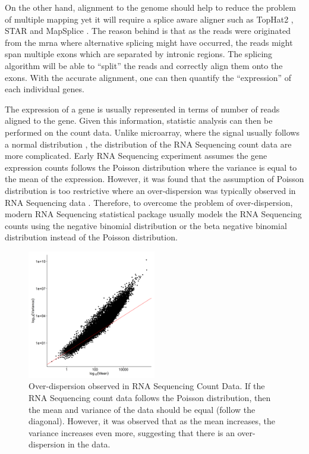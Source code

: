 \documentclass[12pt]{scrbook}
\begin{document}
	On the other hand, alignment to the genome should help to reduce the problem of multiple mapping yet it will require a splice aware aligner such as TopHat2 \citep{Kim2013}, STAR \citep{Dobin2013} and MapSplice \citep{Wang2010}.
	The reason behind is that as the reads were originated from the \gls{mrna} where alternative splicing might have occurred, the reads might span multiple exons which are separated by intronic regions. 
	The splicing algorithm will be able to ``split'' the reads and correctly align them onto the exons. 
	With the accurate alignment, one can then quantify the ``expression'' of each individual genes.
	
	The expression of a gene is usually represented in terms of number of reads aligned to the gene. 
	Given this information, statistic analysis can then be performed on the count data. 
	Unlike microarray, where the signal usually follows a normal distribution \citep{Hoyle2002,Giles2003}, the distribution of the RNA Sequencing count data are more complicated.
	Early RNA Sequencing experiment assumes the gene expression counts follows the Poisson distribution \citep{Marioni2008} where the variance is equal to the mean of the expression.
	However, it was found that the assumption of Poisson distribution is too restrictive where an over-dispersion was typically observed in RNA Sequencing data \citep{Anders2010}.
	Therefore, to overcome the problem of over-dispersion, modern RNA Sequencing statistical package usually models the RNA Sequencing counts using the negative binomial distribution \citep{Anders2010,Robinson2010} or the beta negative binomial distribution \citep{Trapnell2012} instead of the Poisson distribution.
	\begin{figure}
		\centering
		\includegraphics[width=0.5\textwidth]{figure/overdispersion.png}
		\caption[Over-dispersion observed in RNA Sequencing Count Data]{
			Over-dispersion observed in RNA Sequencing Count Data.
			If the RNA Sequencing count data follows the Poisson distribution, then the mean and variance of the data should be equal (follow the diagonal). 
			However, it was observed that as the mean increases, the variance increases even more, suggesting that there is an over-dispersion in the data. 
		}
	\end{figure}
	
\end{document}
